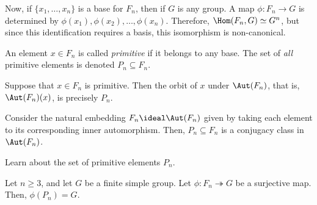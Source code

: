\documentclass[12pt]{article}
\begin{document}
Now, if $\{x_1,\ldots,x_n\}$ is a base for $F_n$, then if $G$ is any group. A map $\phi: F_n \rightarrow G$ is determined by $\phi(x_1),\phi(x_2),\ldots,\phi(x_n)$. Therefore, $\Hom(F_n,G) \simeq G^n$, but since this identification requires a basis, this isomorphism is non-canonical.

\begin{definition}\label{def:Primitive_Elements}
    An element $x \in F_n$ is called \emph{primitive} if it belongs to any base. The set of \emph{all} primitive elements is denoted $P_n \subseteq F_n$.
\end{definition}

\begin{example}\label{exam:Primitive_Elements_and_Automorphisms}
    Suppose that $x \in F_n$ is primitive. Then the orbit of $x$ under $\Aut(F_n)$, that is, $\Aut(F_n)(x)$, is precisely $P_n$.
\end{example}

\begin{example}\label{exam:Self_Embeddings}
    Consider the natural embedding $F_n \ideal \Aut(F_n)$ given by taking each element to its corresponding inner automorphism. Then, $P_n \subseteq F_n$ is a conjugacy class in $\Aut(F_n)$.
\end{example}

\begin{problem}\label{prob:Learn_About_Primitive_Elements}
    Learn about the set of primitive elements $P_n$.
\end{problem}

\begin{conjecture}\label{conj:An_Open_Problem}
    Let $n \geq 3$, and let $G$ be a finite simple group. Let $\phi: F_n \twoheadrightarrow G$ be a surjective map. Then, $\phi(P_n) = G$.
\end{conjecture}
\end{document}
